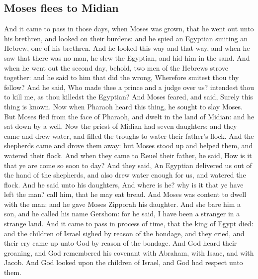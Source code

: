 \begin{biblechapter}
\section*{Moses flees to Midian}
\verse And it came to pass in those days, when Moses was grown, that he went out unto his brethren, and looked on their burdens: and he spied an Egyptian smiting an Hebrew, one of his brethren.
\verse And he looked this way and that way, and when he saw that there was no man, he slew the Egyptian, and hid him in the sand.
\verse And when he went out the second day, behold, two men of the Hebrews strove together: and he said to him that did the wrong, Wherefore smitest thou thy fellow?
\verse And he said, Who made thee a prince and a judge over us? intendest thou to kill me, as thou killedst the Egyptian? And Moses feared, and said, Surely this thing is known.
\verse Now when Pharaoh heard this thing, he sought to slay Moses. But Moses fled from the face of Pharaoh, and dwelt in the land of Midian: and he sat down by a well.
\verse Now the priest of Midian had seven daughters: and they came and drew water, and filled the troughs to water their father's flock.
\verse And the shepherds came and drove them away: but Moses stood up and helped them, and watered their flock.
\verse And when they came to Reuel their father, he said, How is it that ye are come so soon to day?
\verse And they said, An Egyptian delivered us out of the hand of the shepherds, and also drew water enough for us, and watered the flock.
\verse And he said unto his daughters, And where is he? why is it that ye have left the man? call him, that he may eat bread.
\verse And Moses was content to dwell with the man: and he gave Moses Zipporah his daughter.
\verse And she bare him a son, and he called his name Gershom: for he said, I have been a stranger in a strange land.
\verse And it came to pass in process of time, that the king of Egypt died: and the children of Israel sighed by reason of the bondage, and they cried, and their cry came up unto God by reason of the bondage.
\verse And God heard their groaning, and God remembered his covenant with Abraham, with Isaac, and with Jacob.
\verse And God looked upon the children of Israel, and God had respect unto them.
\end{biblechapter}

